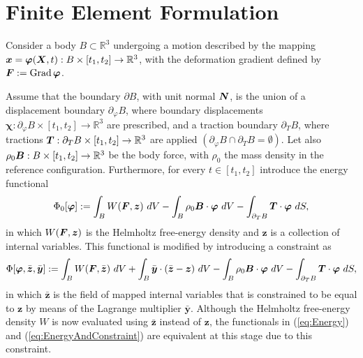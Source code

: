 \documentclass[12pt]{article}
\newcommand{\mbs}[1]{\boldsymbol{#1}}
\newcommand{\mbb}[1]{\mathbb{#1}}
\def\by{{\mbs{y}}} \def\bz{{\mbs{z}}}
\def\bvarphi{{\mbs{\varphi}}}
\def\bchi{{\mbs{\chi}}}
\DeclareMathOperator{\Grad}{Grad}
\begin{document}
\section{Finite Element Formulation}
\label{sec:FE-formulation}

Consider a body $B\subset\mbb{R}^3$ undergoing a motion described by
the mapping $\bx = \bvarphi(\bX, t): B\times[t_1, t_2]\rightarrow
\mbb{R}^3$, with the deformation gradient defined by $\bF := \Grad
\bvarphi$.

Assume that the boundary $\partial B$, with unit normal $\bN$, is the
union of a displacement boundary $\partial_{\varphi} B$, where
boundary displacements $\bchi : \partial_{\varphi} B\times[t_1,
t_2]\rightarrow \mbb{R}^3$ are prescribed, and a traction boundary
$\partial_T B$, where tractions $\bT: \partial_T B \times[t_1,
t_2]\rightarrow \mbb{R}^3$ are applied $(\partial_{\varphi} B \cap
\partial_T B = \emptyset)$. Let also $\rho_0 \bB: B \times [t_1,
t_2]\rightarrow \mbb{R}^3$ be the body force, with $\rho_0$ the mass
density in the reference configuration.  Furthermore, for every $t \in
[t_1, t_2]$ introduce the energy functional
\begin{equation}\label{eq:Energy}
  \Phi_0[ \bvarphi ] :=
  \int_B W(\bF, \bz) \ dV
  -
  \int_B \rho_0 \bB \cdot \bvarphi \ dV
  -
  \int_{\partial_T B} \bT \cdot \bvarphi \ dS,
\end{equation}
in which $W(\bF, \bz)$ is the Helmholtz free-energy density and $\bz$
is a collection of internal variables. This functional is modified by
introducing a constraint as
\begin{equation}\label{eq:EnergyAndConstraint}
  \Phi[ \bvarphi, \bar{\bz}, \bar{\by} ] :=
  \int_B W(\bF, \bar{\bz}) \ dV
  +
  \int_B \bar{\by} \cdot (\bar{\bz} - \bz) \ dV
  -
  \int_B \rho_0 \bB \cdot \bvarphi \ dV
  -
  \int_{\partial_T B} \bT \cdot \bvarphi \ dS,
\end{equation}
in which $\bar{\bz}$ is the field of mapped internal variables that is
constrained to be equal to $\bz$ by means of the Lagrange multiplier
$\bar{\by}$. Although the Helmholtz free-energy density $W$ is now
evaluated using $\bar{\bz}$ instead of $\bz$, the functionals in
(\ref{eq:Energy}) and (\ref{eq:EnergyAndConstraint}) are equivalent at
this stage due to this constraint.
\end{document}
